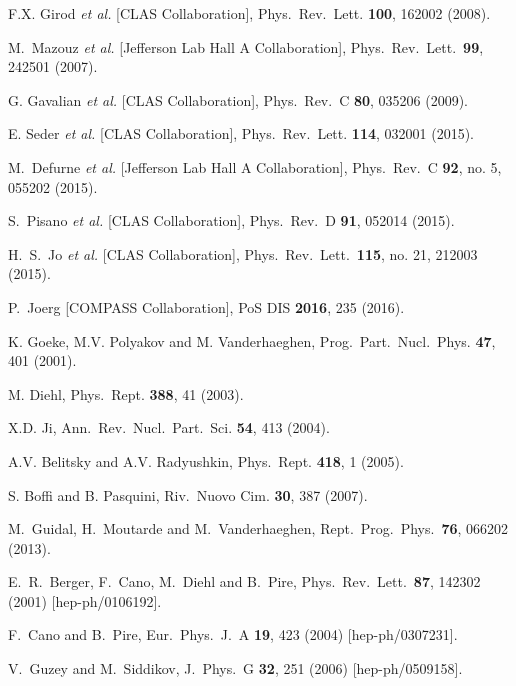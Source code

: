 \documentclass[twocolumn,nofootinbib,showpacs,prl,superscriptaddress,secnumarabic,amssymb,nobibnotes,aps,floatfix]{revtex4}
\begin{document}
\begin{thebibliography}{99}
F.X. Girod {\it et al.} [CLAS Collaboration],
Phys.\ Rev.\ Lett. {\bf 100}, 162002 (2008).

   M.~Mazouz {\it et al.} [Jefferson Lab Hall A Collaboration],
   Phys.\ Rev.\ Lett.\  {\bf 99}, 242501 (2007).

G. Gavalian {\it et al.} [CLAS Collaboration],
Phys.\ Rev.\ C {\bf 80}, 035206 (2009).

E. Seder {\it et al.} [CLAS Collaboration],
Phys.\ Rev.\ Lett. {\bf 114}, 032001 (2015).

  M.~Defurne {\it et al.} [Jefferson Lab Hall A Collaboration],
  Phys.\ Rev.\ C {\bf 92}, no. 5, 055202 (2015).

S.~Pisano {\it et al.} [CLAS Collaboration],
Phys.\ Rev.\ D {\bf 91}, 052014 (2015).

H.~S.~Jo {\it et al.} [CLAS Collaboration],
  Phys.\ Rev.\ Lett.\  {\bf 115}, no. 21, 212003 (2015).

  P.~Joerg [COMPASS Collaboration],
  PoS DIS {\bf 2016}, 235 (2016).

K. Goeke, M.V. Polyakov and M. Vanderhaeghen,
Prog.\ Part.\ Nucl.\ Phys. {\bf 47}, 401 (2001).

M. Diehl,
Phys.\ Rept.  {\bf 388}, 41 (2003).

X.D. Ji,
Ann.\ Rev.\ Nucl.\ Part.\ Sci. {\bf 54}, 413 (2004).

A.V. Belitsky and A.V. Radyushkin,
Phys.\ Rept. {\bf 418}, 1 (2005).

 S. Boffi and B. Pasquini,
Riv.\ Nuovo Cim. {\bf 30}, 387 (2007).

M.~Guidal, H.~Moutarde and M.~Vanderhaeghen,
Rept.\ Prog.\ Phys.\  {\bf 76}, 066202 (2013).

  E.~R.~Berger, F.~Cano, M.~Diehl and B.~Pire,
  Phys.\ Rev.\ Lett.\  {\bf 87}, 142302 (2001)
  [hep-ph/0106192].

  F.~Cano and B.~Pire,
  Eur.\ Phys.\ J.\ A {\bf 19}, 423 (2004)
  [hep-ph/0307231].

  V.~Guzey and M.~Siddikov,
  J.\ Phys.\ G {\bf 32}, 251 (2006)
  [hep-ph/0509158].


\end{thebibliography}
\end{document}
